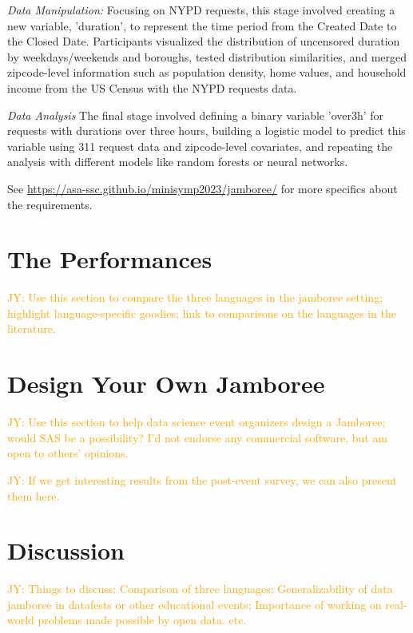 \documentclass[12pt, letterpaper]{article}
\newcommand{\jy}[1]{\textcolor{orange}{JY: #1}}
\begin{document}
\emph{Data Manipulation:} Focusing on NYPD requests, this stage involved
creating a new variable, 'duration', to represent the time period from the
Created Date to the Closed Date. Participants visualized the distribution of
uncensored duration by weekdays/weekends and boroughs, tested distribution
similarities, and merged zipcode-level information such as population density,
home values, and household income from the US Census with the NYPD requests
data.

\emph{Data Analysis} The final stage involved defining a binary variable
'over3h' for requests with durations over three hours, building a logistic model
to predict this variable using 311 request data and zipcode-level covariates,
and repeating the analysis with different models like random forests or neural
networks.

See \url{https://asa-ssc.github.io/minisymp2023/jamboree/} for more specifics
about the requirements.



\section{The Performances}
\label{sec:perf}

\jy{Use this section to compare the three languages in the jamboree setting;
  highlight language-specific goodies; link to comparisons on the languages in
  the literature.}


\section{Design Your Own Jamboree}
\label{sec:design}

\jy{Use this section to help data science event organizers design a Jamboree;
  would SAS be a possibility? I'd not endorse any commercial software, but am
  open to others' opinions.}

\jy{If we get interesting results from the post-event survey, we can also
  present them here.}

\section{Discussion}
\label{sec:disc}

\jy{Things to discuss:
  Comparison of three languages;
  Generalizability of data jamboree in datafests or other educational events;
  Importance of working on real-world problems made possible by open data.
  etc.}





\end{document}

